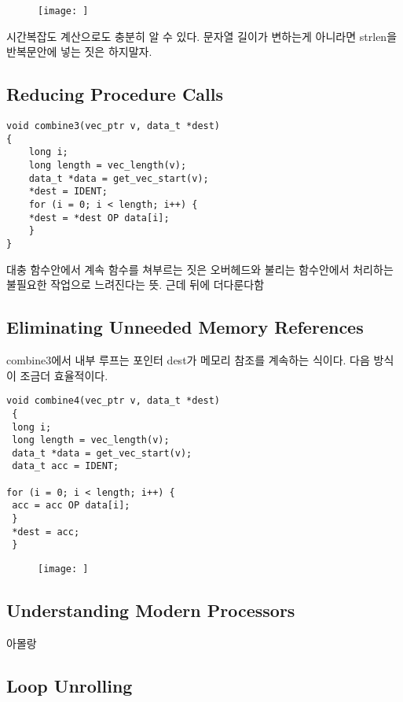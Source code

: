 \begin{figure}[h!]
    \centering
    \texttt{[image: ]}
    \caption{}
\end{figure}

시간복잡도 계산으로도 충분히 알 수 있다.
문자열 길이가 변하는게 아니라면 strlen을 반복문안에 넣는 짓은 하지말자.

\subsection{Reducing Procedure Calls}

\begin{lstlisting}[style = CStyle]
void combine3(vec_ptr v, data_t *dest)
{
    long i;
    long length = vec_length(v);
    data_t *data = get_vec_start(v);
    *dest = IDENT;
    for (i = 0; i < length; i++) {
    *dest = *dest OP data[i];
    }
}
\end{lstlisting}

대충 함수안에서 계속 함수를 쳐부르는 짓은 오버헤드와 불리는 함수안에서 처리하는 불필요한 작업으로 느려진다는 뜻.
근데 뒤에 더다룬다함

\subsection{Eliminating Unneeded Memory References}

combine3에서 내부 루프는 포인터 dest가 메모리 참조를 계속하는 식이다.
다음 방식이 조금더 효율적이다.

\begin{lstlisting}[style = CStyle]
void combine4(vec_ptr v, data_t *dest)
 {
 long i;
 long length = vec_length(v);
 data_t *data = get_vec_start(v);
 data_t acc = IDENT;

for (i = 0; i < length; i++) {
 acc = acc OP data[i];
 }
 *dest = acc;
 }
\end{lstlisting}




\begin{figure}[h!]
    \centering
    \texttt{[image: ]}
    \caption{}
\end{figure}



\subsection{Understanding Modern Processors}

아몰랑


\subsection{Loop Unrolling}

